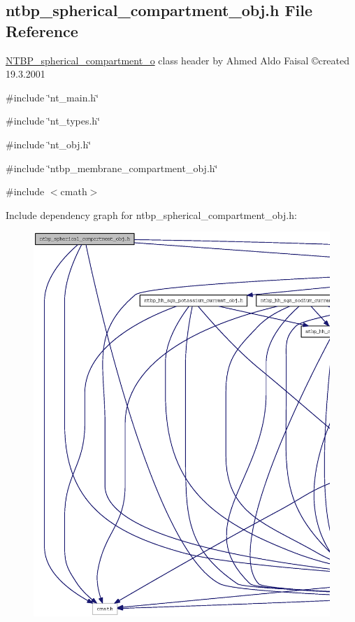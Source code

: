 \subsection{ntbp\_\-spherical\_\-compartment\_\-obj.h File Reference}
\label{ntbp__spherical__compartment__obj_8h}



\begin{DoxyItemize}
\item \hyperlink{class_n_t_b_p__spherical__compartment__o}{NTBP\_\-spherical\_\-compartment\_\-o} class header by Ahmed Aldo Faisal \copyright created 19.3.2001 
\end{DoxyItemize} 


{\ttfamily \#include \char`\"{}nt\_\-main.h\char`\"{}}\par
{\ttfamily \#include \char`\"{}nt\_\-types.h\char`\"{}}\par
{\ttfamily \#include \char`\"{}nt\_\-obj.h\char`\"{}}\par
{\ttfamily \#include \char`\"{}ntbp\_\-membrane\_\-compartment\_\-obj.h\char`\"{}}\par
{\ttfamily \#include $<$cmath$>$}\par
Include dependency graph for ntbp\_\-spherical\_\-compartment\_\-obj.h:
\nopagebreak
\begin{figure}[H]
\begin{center}
\leavevmode
\includegraphics[width=400pt]{ntbp__spherical__compartment__obj_8h__incl}
\end{center}
\end{figure}
